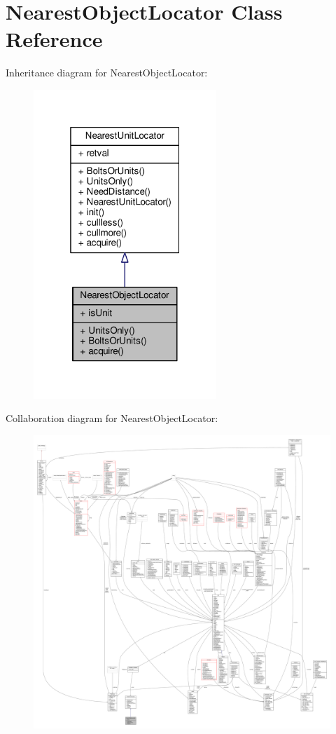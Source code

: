 \hypertarget{classNearestObjectLocator}{}\section{Nearest\+Object\+Locator Class Reference}
\label{classNearestObjectLocator}


Inheritance diagram for Nearest\+Object\+Locator\+:
\nopagebreak
\begin{figure}[H]
\begin{center}
\leavevmode
\includegraphics[width=196pt]{db/da5/classNearestObjectLocator__inherit__graph}
\end{center}
\end{figure}


Collaboration diagram for Nearest\+Object\+Locator\+:
\nopagebreak
\begin{figure}[H]
\begin{center}
\leavevmode
\includegraphics[width=350pt]{d5/dbf/classNearestObjectLocator__coll__graph}
\end{center}
\end{figure}
